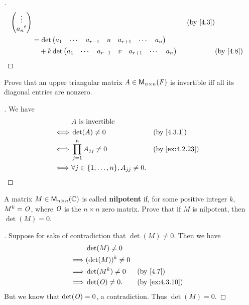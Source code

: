 \begin{proof}[]
\begin{align*}
\begin{pmatrix}
                                            \vdots         \\
                                            \tp{a_n}
                                          \end{pmatrix}                         &  & \by{4.3} \\
            & = \det\begin{pmatrix}
                      a_1 & \cdots & a_{r - 1} & u & a_{r + 1} & \cdots & a_n
                    \end{pmatrix}                   \\
            & \quad + k \det\begin{pmatrix}
                              a_1 & \cdots & a_{r - 1} & v & a_{r + 1} & \cdots & a_n
                            \end{pmatrix}.      &  & \by{4.8}
  \end{align*}
\end{proof}

\begin{ex}\label{ex:4.3.9}
  Prove that an upper triangular matrix \(A \in \ms[n][n][\F]\) is invertible iff all its diagonal entries are nonzero.
\end{ex}

\begin{proof}[]
  We have
  \begin{align*}
         & A \text{ is invertible}                                              \\
    \iff & \det(A) \neq 0                                   &  & \by{4.3.1}     \\
    \iff & \prod_{j = 1}^n A_{j j} \neq 0                   &  & \by{ex:4.2.23} \\
    \iff & \forall j \in \set{1, \dots, n}, A_{j j} \neq 0.
  \end{align*}
\end{proof}

\begin{ex}\label{ex:4.3.10}
  A matrix \(M \in \ms[n][n][\C]\) is called \textbf{nilpotent} if, for some positive integer \(k\), \(M^k = \mathit{O}\), where \(\mathit{O}\) is the \(n \times n\) zero matrix.
  Prove that if \(M\) is nilpotent, then \(\det(M) = 0\).
\end{ex}

\begin{proof}[]
  Suppose for sake of contradiction that \(\det(M) \neq 0\).
  Then we have
  \begin{align*}
             & \det(M) \neq 0                         \\
    \implies & (\det(M))^k \neq 0                     \\
    \implies & \det(M^k) \neq 0   &  & \by{4.7}       \\
    \implies & \det(\zm) \neq 0.  &  & \by{ex:4.3.10}
  \end{align*}
  But we know that \(\det(\mathit{O}) = 0\), a contradiction.
  Thus \(\det(M) = 0\).
\end{proof}

